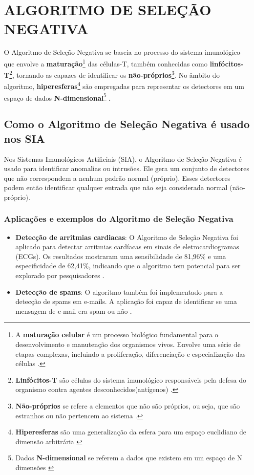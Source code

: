 \chapter{\MakeUppercase{Algoritmo de Seleção Negativa}}
\thispagestyle{mystyle}

O Algoritmo de Seleção Negativa se baseia no processo do sistema imunológico que envolve a \textbf{maturação}\footnote{A \textbf{maturação celular} é um processo biológico fundamental para o desenvolvimento e manutenção dos organismos vivos. Envolve uma série de etapas complexas, incluindo a proliferação, diferenciação e especialização das células \cite{cisce2024}.} das células-T, também conhecidas como \textbf{linfócitos-T}\footnote{\textbf{Linfócitos-T} são células do sistema imunológico responsáveis pela defesa do organismo contra agentes desconhecidos(antígenos) \cite{maestrovirtuale2024}.}, tornando-as capazes de identificar os \textbf{não-próprios}\footnote{\textbf{Não-próprios} se refere a elementos que não são próprios, ou seja, que são estranhos ou não pertencem ao sistema \cite{microbiologybook2024}.}. No âmbito do algoritmo, \textbf{hiperesferas}\footnote{\textbf{Hiperesferas} são uma generalização da esfera para um espaço euclidiano de dimensão arbitrária \cite{weisstein2024}} são empregadas para representar os detectores em um espaço de dados \textbf{N-dimensional}\footnote{Dados \textbf{N-dimensional} se referem a dados que existem em um espaço de N dimensões \cite{ndimensional2022}} \cite{aispackage2024}.

\section{Como o Algoritmo de Seleção Negativa é usado nos SIA}
\thispagestyle{mystyle}

Nos Sistemas Imunológicos Artificiais (SIA), o Algoritmo de Seleção Negativa é usado para identificar anomalias ou intrusões. Ele gera um conjunto de detectores que não correspondem a nenhum padrão normal (próprio). Esses detectores podem então identificar qualquer entrada que não seja considerada normal (não-próprio).

\subsection{Aplicações e exemplos do Algoritmo de Seleção Negativa}

\begin{itemize}
    \item \textbf{Detecção de arritmias cardiacas}: O Algoritmo de Seleção Negativa foi aplicado para detectar arritmias cardíacas em sinais de eletrocardiogramas (ECGs). Os resultados mostraram uma sensibilidade de 81,96\% e uma especificidade de 62,41\%, indicando que o algoritmo tem potencial para ser explorado por pesquisadores \cite{petrikicz2016}.

    \item \textbf{Detecção de spams}: O algoritmo também foi implementado para a detecção de spams em e-mails. A aplicação foi capaz de identificar se uma mensagem de e-mail era spam ou não \cite{cunha2012}.
\end{itemize}

